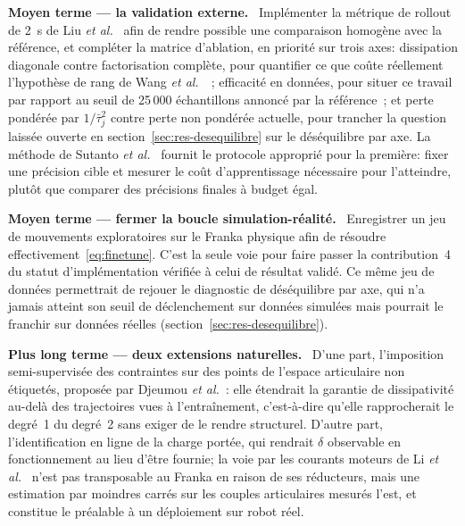 \documentclass[a4paper, oneside]{article}
\newcommand{\parag}[1]{%
    \par\medskip\noindent\textbf{#1}\ \ignorespaces%
}
\begin{document}
\parag{Moyen terme — la validation externe.} Implémenter la métrique de
rollout de 2~s de Liu \emph{et al.}~\cite{liu2024} afin de rendre possible une
comparaison homogène avec la référence, et compléter la matrice d'ablation, en
priorité sur trois axes: dissipation diagonale contre factorisation complète,
pour quantifier ce que coûte réellement l'hypothèse de rang de
Wang \emph{et al.}~\cite{wang2025spel}~; efficacité en données, pour situer ce
travail par rapport au seuil de 25\,000 échantillons annoncé par la
référence~; et perte pondérée par $1/\bar{\tau}_j^2$ contre perte non pondérée
actuelle, pour trancher la question laissée ouverte en
section~\ref{sec:res-desequilibre} sur le déséquilibre par axe.
La méthode de Sutanto \emph{et al.}~\cite{sutanto2020} fournit le protocole
approprié pour la première: fixer une précision cible et mesurer le coût
d'apprentissage nécessaire pour l'atteindre, plutôt que comparer des précisions
finales à budget égal.

\parag{Moyen terme — fermer la boucle simulation-réalité.} Enregistrer un
jeu de mouvements exploratoires sur le Franka physique afin de résoudre
effectivement~\eqref{eq:finetune}. C'est la seule voie pour faire passer la
contribution~4 du statut d'implémentation vérifiée à celui de résultat validé.
Ce même jeu de données permettrait de rejouer le diagnostic de déséquilibre par
axe, qui n'a jamais atteint son seuil de déclenchement sur données simulées mais
pourrait le franchir sur données réelles
(section~\ref{sec:res-desequilibre}).

\parag{Plus long terme — deux extensions naturelles.} D'une part,
l'imposition semi-supervisée des contraintes sur des points de l'espace
articulaire non étiquetés, proposée par
Djeumou \emph{et al.}~\cite{djeumou2022}: elle étendrait la garantie de
dissipativité au-delà des trajectoires vues à l'entraînement, c'est-à-dire
qu'elle rapprocherait le degré~1 du degré~2 sans exiger de le rendre
structurel. D'autre part, l'identification en ligne de la charge portée, qui
rendrait $\delta$ observable en fonctionnement au lieu d'être fournie; la voie
par les courants moteurs de Li \emph{et al.}~\cite{li2025ral} n'est pas
transposable au Franka en raison de ses réducteurs, mais une estimation par
moindres carrés sur les couples articulaires mesurés l'est, et constitue le
préalable à un déploiement sur robot réel.

\printbibliography[title={Références}]
\end{document}
